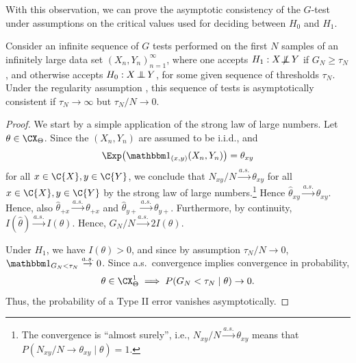With this observation, we can prove the asymptotic consistency of the $G$-test under assumptions on the critical values used
for deciding between $H_0$ and $H_1$. 
\begin{Cor}\label{cor:G_test_consistency}
Consider an infinite sequence of $G$ tests performed on the first $N$ samples of an infinitely large
data set $(X_n,Y_n)_{n=1}^\infty$, where one 
accepts $H_1 : X \operatorname*{\not\mkern-2mu\perp\mkern-11mu\perp} Y$ if $G_N \ge \tau_N$, and otherwise accepts $H_0 : X \operatorname*{\perp\mkern-11mu\perp} Y$, 
for some given sequence of thresholds $\tau_N$.
Under the regularity assumption , this sequence of tests is
asymptotically consistent if $\tau_N \to \infty$ but $\tau_N / N \to 0$.
\end{Cor}
\begin{proof}
We start by a simple application of the strong law of large numbers.
Let $\theta \in \CX_\Theta$. Since the $(X_n,Y_n)$ are assumed to be i.i.d., and 
  $$\Exp \big(\I_{(x,y)}(X_n,Y_n)\big) = \theta_{xy}$$
for all $x \in \C{X}, y \in \C{Y}$,
we conclude that $N_{xy} / N \stackrel{a.s.}{\to} \theta_{xy}$ for all $x \in \C{X}, y \in \C{Y}$
by the strong law of large numbers.\footnote{The convergence is ``almost surely'', 
i.e., $N_{xy} / N \stackrel{a.s.}{\to} \theta_{xy}$ means that
$P(N_{xy} / N \to \theta_{xy} \mid \theta) = 1$.}
Hence $\hat\theta_{xy} \stackrel{a.s.}{\to} \theta_{xy}$. Hence, also
$\hat\theta_{+ x} \stackrel{a.s.}{\to} \theta_{+ x}$ and
$\hat\theta_{y +} \stackrel{a.s.}{\to} \theta_{y +}$.
Furthermore, by continuity, $I(\hat\theta) \stackrel{a.s.}{\to} I(\theta)$.
Hence, $G_N / N \stackrel{a.s.}{\to} 2I(\theta)$. 
  
Under $H_1$, we have $I(\theta) > 0$,
and since by assumption $\tau_N / N \to 0$, 
$\I_{G_N < \tau_N} \stackrel{a.s.}{\to} 0$. 
Since a.s.\ convergence implies convergence in probability,
  $$\theta \in \CX_\Theta^1 \implies P(G_N < \tau_N \mid \theta) \to 0.$$
Thus, the probability of a Type II error vanishes asymptotically.


\end{proof}
